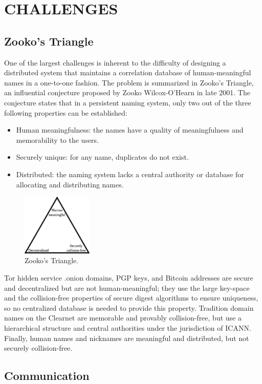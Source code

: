 
\chapter{CHALLENGES}

\section{Zooko's Triangle}

One of the largest challenges is inherent to the difficulty of designing a distributed system that maintains a correlation database of human-meaningful names in a one-to-one fashion. The problem is summarized in Zooko's Triangle, an influential conjecture proposed by Zooko Wilcox-O'Hearn in late 2001. The conjecture states that in a persistent naming system, only two out of the three following properties can be established:\cite{ferdous2009security}

\begin{itemize}
  \item Human meaningfulness: the names have a quality of meaningfulness and memorability to the users. 
  \item Securely unique: for any name, duplicates do not exist.
  \item Distributed: the naming system lacks a central authority or database for allocating and distributing names.
\end{itemize}

\begin{figure}[htbp]
	\centering
	\includegraphics[width=0.3\textwidth]{images/Zooko.eps}
	\caption{Zooko's Triangle.}
\end{figure}

Tor hidden service .onion domains, PGP keys, and Bitcoin addresses are secure and decentralized but are not human-meaningful; they use the large key-space and the collision-free properties of secure digest algorithms to ensure uniqueness, so no centralized database is needed to provide this property. Tradition domain names on the Clearnet are memorable and provably collision-free, but use a hierarchical structure and central authorities under the jurisdiction of ICANN. Finally, human names and nicknames are meaningful and distributed, but not securely collision-free.\cite{stiegler2005petname}

\section{Communication}



